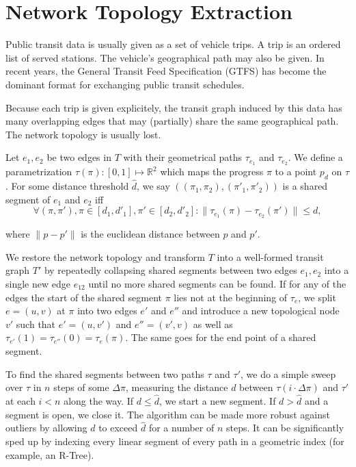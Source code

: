 \documentclass{llncs}
\begin{document}
%
\section{Network Topology Extraction}\label{SEC:topo}
%

Public transit data is usually given as a set of vehicle trips. A trip is an ordered list of served stations. The vehicle's geographical path may also be given. In recent years, the General Transit Feed Specification (GTFS) has become the dominant format for exchanging public transit schedules.

Because each trip is given explicitely, the transit graph induced by this data has many overlapping edges that may (partially) share the same geographical path. The network topology is usually lost.

Let $e_1, e_2$ be two edges in $T$ with their geometrical paths $\tau_{e_1}$ and $\tau_{e_2}$. We define a parametrization $\tau(\pi): [0,1] \mapsto \mathbb{R}^2$ which maps the progress $\pi$ to a point $p_d$ on $\tau$. For some distance threshold $\hat{d}$, we say $((\pi_1, \pi_2), ({\pi'}_1, {\pi'}_2))$ is a shared segment of $e_1$ and $e_2$ iff \[\forall (\pi, \pi'), \pi \in [d_1, {d'}_1], \pi' \in [d_2, {d'}_2] : \|\tau_{e_1}(\pi) - \tau_{e_2}(\pi')\| \leq d,\]

where $\|p - p'\|$ is the euclidean distance between $p$ and $p'$.

We restore the network topology and transform $T$ into a well-formed transit graph $T'$ by repeatedly collapsing shared segments between two edges $e_1, e_2$ into a single new edge $e_{12}$ until no more shared segments can be found. If for any of the edges the start of the shared segment $\pi$ lies not at the beginning of $\tau_e$, we split $e = (u, v)$ at $\pi$ into two edges $e'$ and $e''$ and introduce a new topological node $v'$ such that $e' = (u, v')$ and $e'' = (v', v)$ as well as $\tau_{e'}(1) = \tau_{e''}(0) = \tau_{e}(\pi)$. The same goes for the end point of a shared segment.

To find the shared segments between two paths $\tau$ and $\tau'$, we do a simple sweep over $\tau$ in $n$ steps of some $\Delta\pi$, measuring the distance $d$ between $\tau(i\cdot\Delta\pi)$ and $\tau'$ at each $i < n$ along the way. If $d \leq \hat{d}$, we start a new segment. If $d > \hat{d}$ and a segment is open, we close it. The algorithm can be made more robust against outliers by allowing $d$ to exceed $\hat{d}$ for a number of $n$ steps. It can be significantly sped up by indexing every linear segment of every path in a geometric index (for example, an R-Tree).
\end{document}
